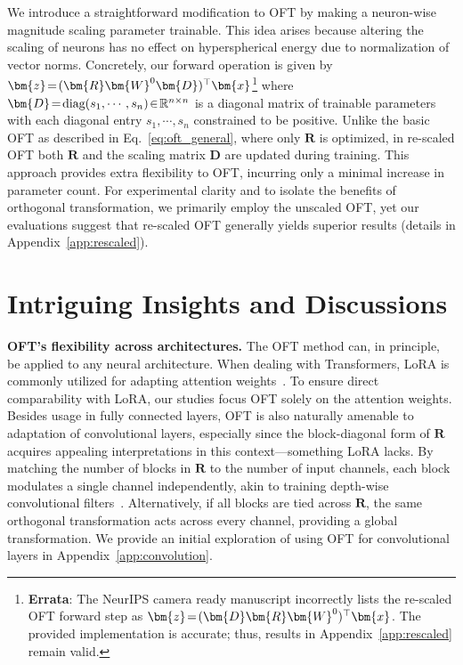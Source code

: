 We introduce a straightforward modification to OFT by making a neuron-wise magnitude scaling parameter trainable. This idea arises because altering the scaling of neurons has no effect on hyperspherical energy due to normalization of vector norms. Concretely, our forward operation is given by $\thickmuskip=2mu \medmuskip=2mu\bm{z}=(\bm{R}\bm{W}^0\bm{D})^\top\bm{x}$\footnote{\textbf{Errata}: The NeurIPS camera ready manuscript incorrectly lists the re-scaled OFT forward step as $\thickmuskip=2mu \medmuskip=2mu\bm{z}=(\bm{D}\bm{R}\bm{W}^0)^\top\bm{x}$. The provided implementation is accurate; thus, results in Appendix~\ref{app:rescaled} remain valid.} where $\thickmuskip=2mu \medmuskip=2mu \bm{D}=\text{diag}(s_1,\cdots,s_n)\in\mathbb{R}^{n\times n}$ is a diagonal matrix of trainable parameters with each diagonal entry $s_1,\cdots,s_n$ constrained to be positive. Unlike the basic OFT as described in Eq.~\eqref{eq:oft_general}, where only $\bm{R}$ is optimized, in re-scaled OFT both $\bm{R}$ and the scaling matrix $\bm{D}$ are updated during training. This approach provides extra flexibility to OFT, incurring only a minimal increase in parameter count. For experimental clarity and to isolate the benefits of orthogonal transformation, we primarily employ the unscaled OFT, yet our evaluations suggest that re-scaled OFT generally yields superior results (details in Appendix~\ref{app:rescaled}).

\section{Intriguing Insights and Discussions}

\textbf{OFT’s flexibility across architectures.} The OFT method can, in principle, be applied to any neural architecture. When dealing with Transformers, LoRA is commonly utilized for adapting attention weights~\cite{hulora2022}. To ensure direct comparability with LoRA, our studies focus OFT solely on the attention weights. Besides usage in fully connected layers, OFT is also naturally amenable to adaptation of convolutional layers, especially since the block-diagonal form of $\bm{R}$ acquires appealing interpretations in this context—something LoRA lacks. By matching the number of blocks in $\bm{R}$ to the number of input channels, each block modulates a single channel independently, akin to training depth-wise convolutional filters~\cite{chollet2017xception}. Alternatively, if all blocks are tied across $\bm{R}$, the same orthogonal transformation acts across every channel, providing a global transformation. We provide an initial exploration of using OFT for convolutional layers in Appendix~\ref{app:convolution}.

